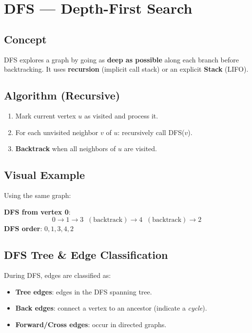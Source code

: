 \documentclass[12pt,a4paper]{article}
\begin{document}
\newpage

\section{DFS — Depth-First Search}

\subsection{Concept}
DFS explores a graph by going as \textbf{deep as possible} along each branch before backtracking. It uses \textbf{recursion} (implicit call stack) or an explicit \textbf{Stack} (LIFO).

\subsection{Algorithm (Recursive)}

\begin{enumerate}
    \item Mark current vertex $u$ as visited and process it.
    \item For each unvisited neighbor $v$ of $u$: recursively call DFS($v$).
    \item \textbf{Backtrack} when all neighbors of $u$ are visited.
\end{enumerate}

\subsection{Visual Example}

Using the same graph:

\textbf{DFS from vertex 0}:
\[
0 \to 1 \to 3 \;\;(\text{backtrack}) \to 4 \;\;(\text{backtrack}) \to 2
\]
\textbf{DFS order}: $0, 1, 3, 4, 2$

\subsection{DFS Tree \& Edge Classification}
During DFS, edges are classified as:
\begin{itemize}
    \item \textbf{Tree edges}: edges in the DFS spanning tree.
    \item \textbf{Back edges}: connect a vertex to an ancestor (indicate a \textit{cycle}).
    \item \textbf{Forward/Cross edges}: occur in directed graphs.
\end{itemize}
\end{document}
